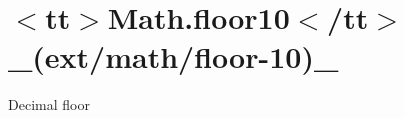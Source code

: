 \chapter{\texorpdfstring{$<$}{<}tt\texorpdfstring{$>$}{>}Math.\+floor10\texorpdfstring{$<$}{<}/tt\texorpdfstring{$>$}{>} \+\_\+(ext/math/floor-\/10)\+\_\+}
\hypertarget{md__2home_2solype_2delivery_2current__days_2Mannheim_2front_2node__modules_2ext_2docs_2math_2floor-10}{}\label{md__2home_2solype_2delivery_2current__days_2Mannheim_2front_2node__modules_2ext_2docs_2math_2floor-10}
\label{md__2home_2solype_2delivery_2current__days_2Mannheim_2front_2node__modules_2ext_2docs_2math_2floor-10_autotoc_md2571}%
%
 Decimal floor


\begin{DoxyCode}{0}
\DoxyCodeLine{}

\end{DoxyCode}
 